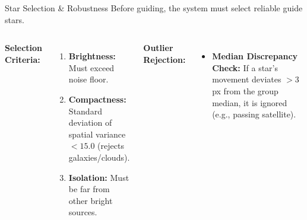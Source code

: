 \begin{frame}{Star Selection \& Robustness}
    Before guiding, the system must select reliable guide stars.
    
    \begin{columns}
        \textbf{Selection Criteria:}
        \begin{enumerate}
            \item \textbf{Brightness:} Must exceed noise floor.
            \item \textbf{Compactness:} Standard deviation of spatial variance $< 15.0$ (rejects galaxies/clouds).
            \item \textbf{Isolation:} Must be far from other bright sources.
        \end{enumerate}
        
        \vspace{0.3cm}
        \textbf{Outlier Rejection:}
        \begin{itemize}
            \item \textbf{Median Discrepancy Check:} If a star's movement deviates $>3$px from the group median, it is ignored (e.g., passing satellite).
        \end{itemize}
        
        \centering
    \end{columns}
\end{frame}

